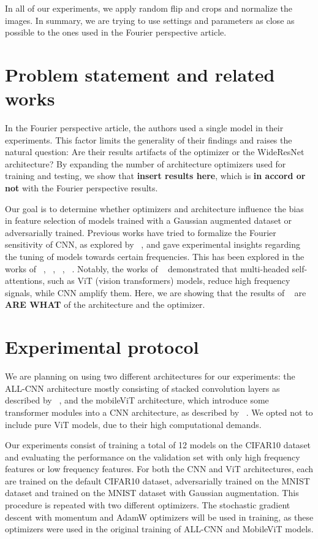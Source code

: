 \documentclass{article} \author{Simon Théorêt}
\begin{document}
In all of our experiments, we apply random flip and crops and
normalize the images. In summary, we are trying to use settings and
parameters as close as possible to the ones used in the Fourier
perspective article.

\section{Problem statement and related works}
In the Fourier perspective article, the authors used a single model in
their experiments. This factor limits the generality of their findings
and raises the natural question: Are their results artifacts of the
optimizer or the WideResNet architecture? By expanding the number of
architecture optimizers used for training and testing, we show that
\textbf{insert results here}, which is \textbf{in accord or not} with
the Fourier perspective results.

Our goal is to determine whether optimizers and architecture influence
the bias in feature selection of models trained with a Gaussian
augmented dataset or adversarially trained. Previous works have tried
to formalize the Fourier sensitivity of CNN, as explored by
~\citep{krishnamachari2023fourier}, and gave experimental insights
regarding the tuning of models towards certain frequencies. This has
been explored in the works of ~\citep{krishnamachari2023fourier},
~\citep{geirhos2022imagenettrained}, ~\citep{yin2020fourier},
~\citep{mo2022adversarial}. Notably, the works of
~\citep{park2022vision} demonstrated that multi-headed
self-attentions, such as ViT (vision transformers) models, reduce high
frequency signals, while CNN amplify them. Here, we are showing that
the results of ~\citep{yin2020fourier} are \textbf{ARE WHAT} of the
architecture and the optimizer.

\section{Experimental protocol}
We are planning on using two different architectures for our
experiments: the ALL-CNN architecture mostly consisting of stacked
convolution layers as described by ~\citep{springenberg2015striving},
and the mobileViT architecture, which introduce some transformer
modules into a CNN architecture, as described by
~\citep{mehta2022mobilevit}. We opted not to include pure ViT models,
due to their high computational demands.

Our experiments consist of training a total of 12 models on the
CIFAR10 dataset and evaluating the performance on the validation set
with only high frequency features or low frequency features. For both
the CNN and ViT architectures, each are trained on the default CIFAR10
dataset, adversarially trained on the MNIST dataset and trained on the
MNIST dataset with Gaussian augmentation. This procedure is repeated
with two different optimizers. The stochastic gradient descent with
momentum and AdamW optimizers will be used in training, as these
optimizers were used in the original training of ALL-CNN and MobileViT
models.
\end{document}
